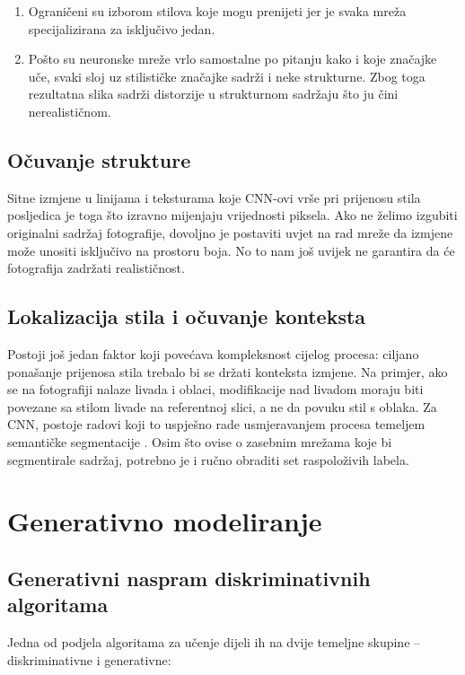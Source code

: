 \documentclass[lmodern, utf8, seminar]{fer}
\begin{document}
\begin{enumerate} 
\item Ograničeni su izborom stilova koje mogu prenijeti jer je svaka mreža specijalizirana za isključivo jedan.
\item Pošto su neuronske mreže vrlo samostalne po pitanju kako i koje značajke uče, svaki sloj uz stilističke značajke sadrži i neke strukturne. Zbog toga rezultatna slika sadrži distorzije u strukturnom sadržaju što ju čini nerealističnom.
\end{enumerate}

\newpage
\section{Očuvanje strukture}
Sitne izmjene u linijama i teksturama koje CNN-ovi vrše pri prijenosu stila posljedica je toga što izravno mijenjaju vrijednosti piksela. Ako ne želimo izgubiti originalni sadržaj fotografije, dovoljno je postaviti uvjet na rad mreže da izmjene može unositi isključivo na prostoru boja. No to nam još uvijek ne garantira da će fotografija zadržati realističnost.

\section{Lokalizacija stila i očuvanje konteksta}
Postoji još jedan faktor koji povećava kompleksnost cijelog procesa: ciljano ponašanje prijenosa stila trebalo bi se držati konteksta izmjene. Na primjer, ako se na fotografiji nalaze livada i oblaci, modifikacije nad livadom moraju biti povezane sa stilom livade na referentnoj slici, a ne da povuku stil s oblaka. 
Za CNN, postoje radovi koji to uspješno rade usmjeravanjem procesa temeljem semantičke segmentacije \cite{luan2017deep}. Osim što ovise o zasebnim mrežama koje bi segmentirale sadržaj, potrebno je i ručno obraditi set raspoloživih labela.




\chapter{Generativno modeliranje}
\section{Generativni naspram diskriminativnih algoritama}
Jedna od podjela algoritama za učenje dijeli ih na dvije temeljne skupine -- diskriminativne i generativne:
\newline
\end{document}
